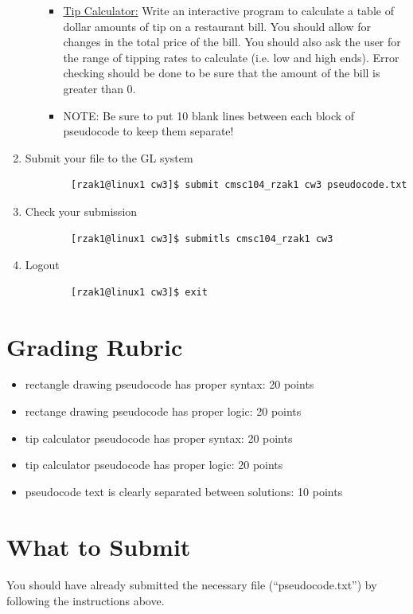 \documentclass[letter,11pt]{article}
\begin{document}
\begin{enumerate}
\begin{itemize}
\begin{itemize}
            \item \underline{Tip Calculator:} Write an interactive program to calculate a table of dollar amounts of tip on a restaurant bill. You should allow for changes in the total price of the bill. You should also ask the user for the range of tipping rates to calculate (i.e. low and high ends). Error checking should be done to be sure that the amount of the bill is greater than 0.
            \item NOTE: Be sure to put 10 blank lines between each block of pseudocode to keep them separate!
        \end{itemize}
    \end{itemize}
    \item Submit your file to the GL system
    \begin{verbatim}
        [rzak1@linux1 cw3]$ submit cmsc104_rzak1 cw3 pseudocode.txt
    \end{verbatim}
    \item Check your submission
    \begin{verbatim}
        [rzak1@linux1 cw3]$ submitls cmsc104_rzak1 cw3
    \end{verbatim}
    \item Logout
    \begin{verbatim}
        [rzak1@linux1 cw3]$ exit
    \end{verbatim}
\end{enumerate}

\section*{Grading Rubric}
\begin{itemize}
    \item rectangle drawing pseudocode has proper syntax: 20 points
    \item rectange drawing pseudocode has proper logic: 20 points
    \item tip calculator pseudocode has proper syntax: 20 points
    \item tip calculator pseudocode has proper logic: 20 points
    \item pseudocode text is clearly separated between solutions: 10 points
\end{itemize}

\section*{What to Submit}
\paragraph{}You should have already submitted the necessary file (``pseudocode.txt'') by following the instructions above.
\end{document}
